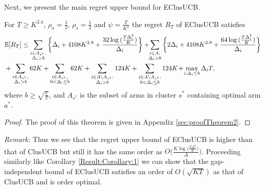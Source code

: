 Next, we present the main regret upper bound for EClusUCB.

\begin{theorem}
\label{Result:Theorem:1}
For $T\geq K^{2.4} $, $\rho_a =\frac{1}{2}$, $\rho_s =\frac{1}{2}$ and $\psi=\frac{T}{K^2}$ the regret $R_T$ of EClusUCB satisfies
\begin{align*}
&\mathbb{E} [R_{T}]\leq 
\sum\limits_{\substack{i\in A_{s^{*}},\\\Delta_{i} > b}}\bigg\lbrace \Delta_{i} + 4108K^{2.8}
+ \frac{32\log{(\frac{T\Delta_i^2}{K})}}{\Delta_{i}} \bigg\rbrace
 + \! \! \sum\limits_{\substack{i\in A,\\\Delta_{i} > b}} \bigg\lbrace 2\Delta_{i} +
4108K^{2.8} + \frac{64\log{(\frac{T\Delta_i^2}{K})}}{\Delta_{i}} \bigg\rbrace \\
&+ \sum\limits_{\substack{i\in A_{s^{*}},\\ \Delta_{i} > b}} 
62K+\sum\limits_{\substack{i\in A_{s^{*}},\\0 < \Delta_{i}\leq b}} 62K + \sum_{\substack{i\in A\setminus A_{s^*}:\\\Delta_{i}> b}}124K +\sum_{\substack{i\in A \setminus A_{s^*}:\\ 0 < \Delta_{i} \leq b}}124K 
 \!+\! \max\limits_{i:\Delta_{i}\leq b}\Delta_{i}T, 
\end{align*}
where $b\geq \sqrt{\frac{e}{T}}$, and $A_{s^{*}}$ is the subset of arms in cluster $s^{*}$ containing optimal arm $a^{*}$.
\end{theorem}

\begin{proof}
The proof of this theorem is given in Appendix \ref{sec:proofTheorem2}.
\end{proof}

\textit{Remark:} Thus we see that the regret upper bound of EClusUCB is higher than that of ClusUCB but still it has the same order as $O\bigg(\frac{K\log \big(\frac{T\Delta^{2}}{K}\big)}{\Delta}\bigg)$. Proceeding similarly like Corollary \ref{Result:Corollary:1} we can show that the gap-independent bound of EClusUCB satisfies an order of $O\left( \sqrt{KT}\right)$ as that of ClusUCB and is order optimal.
